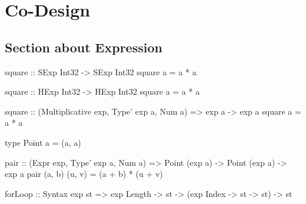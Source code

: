 \lipsum[4]

%
%

\chapter{Co-Design}

\lipsum[5]

\section{Section about Expression}

\lipsum[1]

\begin{code}
square :: SExp Int32 -> SExp Int32
square a = a * a
\end{code}

\lipsum[1]

\begin{stub}
square :: HExp Int32 -> HExp Int32
square a = a * a
\end{stub}

\lipsum[1]

\begin{stub}
square :: (Multiplicative exp, Type' exp a, Num a) => exp a -> exp a
square a = a * a
\end{stub}

\lipsum[1]

\begin{code}
type Point a = (a, a)

pair :: (Expr exp, Type' exp a, Num a) => Point (exp a) -> Point (exp a) -> exp a
pair (a, b) (u, v) = (a + b) * (u + v)
\end{code}

\lipsum[1]


\lipsum[1]

\begin{stub}
forLoop :: Syntax exp st => exp Length -> st -> (exp Index -> st -> st) -> st
\end{stub}

